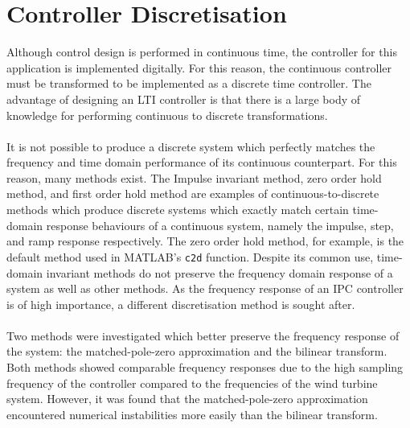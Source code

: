 \section{Controller Discretisation}
Although control design is performed in continuous time, the controller for this application is implemented digitally. For this reason, the continuous controller must be transformed to be implemented as a discrete time controller. The advantage of designing an LTI controller is that there is a large body of knowledge for performing continuous to discrete transformations. 
\\~\\
It is not possible to produce a discrete system which perfectly matches the frequency and time domain performance of its continuous counterpart. For this reason, many methods exist. The Impulse invariant method, zero order hold method, and first order hold method are examples of continuous-to-discrete methods which produce discrete systems which exactly match certain time-domain response behaviours of a continuous system, namely the impulse, step, and ramp response respectively. The zero order hold method, for example, is the default method used in MATLAB's \texttt{c2d} function. Despite its common use, time-domain invariant methods do not preserve the frequency domain response of a system as well as other methods. As the frequency response of an IPC controller is of high importance, a different discretisation method is sought after.
\\~\\
Two methods were investigated which better preserve the frequency response of the system: the matched-pole-zero approximation and the bilinear transform. Both methods showed comparable frequency responses due to the high sampling frequency of the controller compared to the frequencies of the wind turbine system. However, it was found that the matched-pole-zero approximation encountered numerical instabilities more easily than the bilinear transform. 





